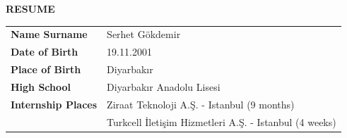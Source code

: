 \cleardoublepage
\thispagestyle{plain}
\vspace{1.0cm}

{\large\bfseries RESUME}\par
\vspace{0.8cm}

\noindent
\begin{tabular}{@{}p{}p{}@{}}
\textbf{Name Surname} & Serhet G\"{o}kdemir \\
\textbf{Date of Birth} &  19.11.2001 \\
\textbf{Place of Birth} & Diyarbakır \\
\textbf{High School} & Diyarbakır Anadolu Lisesi \\
\textbf{Internship Places} & Ziraat Teknoloji A.Ş. - Istanbul (9 months) \\
& Turkcell İletişim Hizmetleri A.Ş. - Istanbul (4 weeks) \\
\end{tabular}

\vspace{0.8cm}

